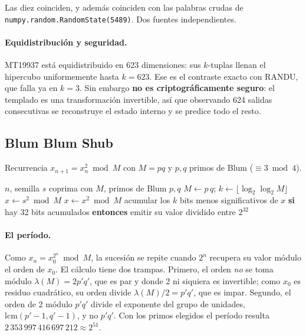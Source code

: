 Las diez coinciden, y además coinciden con las palabras crudas de
\texttt{numpy.random.RandomState(5489)}. Dos fuentes independientes.

\paragraph{Equidistribución y seguridad.} MT19937 está equidistribuido en 623
dimensiones: sus $k$-tuplas llenan el hipercubo uniformemente hasta $k=623$.
Ese es el contraste exacto con RANDU, que falla ya en $k=3$. Sin embargo
\textbf{no es criptográficamente seguro}: el templado es una transformación
invertible, así que observando 624 salidas consecutivas se reconstruye el
estado interno y se predice todo el resto.

\subsection{Blum Blum Shub}

Recurrencia $x_{n+1} = x_n^2 \bmod M$ con $M = pq$ y $p,q$ primos de Blum
($\equiv 3 \bmod 4$).

\begin{algorithm}[H]
\caption{Blum Blum Shub}
\begin{algorithmic}[1]
\Require $n$, semilla $s$ coprima con $M$, primos de Blum $p,q$
\State $M \gets p\,q$; \quad $k \gets \lfloor \log_2 \log_2 M \rfloor$
\State $x \gets s^2 \bmod M$ 
  \State $x \gets x^2 \bmod M$
  \State acumular los $k$ bits menos significativos de $x$
  \State \textbf{si} hay 32 bits acumulados \textbf{entonces} emitir su valor dividido entre $2^{32}$
\EndWhile
\end{algorithmic}
\end{algorithm}

\begin{table}[H]
\centering\small

\caption{Condiciones verificadas sobre los primos elegidos.}
\label{tab:bbs-condiciones}
\end{table}

\paragraph{El período.} Como $x_n = x_0^{2^n} \bmod M$, la sucesión se repite
cuando $2^n$ recupera su valor módulo el orden de $x_0$. El cálculo tiene dos
trampas. Primero, el orden \emph{no} se toma módulo $\lambda(M) = 2p'q'$, que
es par y donde 2 ni siquiera es invertible; como $x_0$ es residuo cuadrático,
su orden divide $\lambda(M)/2 = p'q'$, que es impar. Segundo, el orden de 2
módulo $p'q'$ divide el exponente del grupo de unidades, $\mathrm{lcm}(p'-1,
q'-1)$, y no $p'q'$. Con los primos elegidos el período resulta
$2\,353\,997\,416\,697\,212 \approx 2^{51}$.

